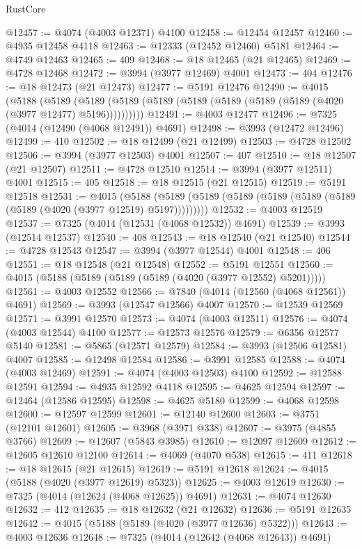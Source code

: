 \begin{lexlean}{RustCore}
\begin{coremodule}
@12457 := @4074 (@4003 @12371) @4100
@12458 := @12454 @12457
@12460 := @4935 @12458 @4118
@12463 := @12333 (@12452 @12460) @5181
@12464 := @4749 @12463
@12465 := 409
@12468 := @18 @12465 (@21 @12465)
@12469 := @4728 @12468
@12472 := @3994 (@3977 @12469) @4001
@12473 := 404
@12476 := @18 @12473 (@21 @12473)
@12477 := @5191 @12476
@12490 := @4015
    (@5188
      (@5189 (@5189 (@5189 (@5189 (@5189 (@5189 (@5189 (@5189 (@4020 (@3977 @12477) @5196))))))))))
@12491 := @4003 @12477
@12496 := @7325 (@4014 (@12490 (@4068 @12491)) @4691)
@12498 := @3993 (@12472 @12496)
@12499 := 410
@12502 := @18 @12499 (@21 @12499)
@12503 := @4728 @12502
@12506 := @3994 (@3977 @12503) @4001
@12507 := 407
@12510 := @18 @12507 (@21 @12507)
@12511 := @4728 @12510
@12514 := @3994 (@3977 @12511) @4001
@12515 := 405
@12518 := @18 @12515 (@21 @12515)
@12519 := @5191 @12518
@12531 := @4015
    (@5188 (@5189 (@5189 (@5189 (@5189 (@5189 (@5189 (@5189 (@4020 (@3977 @12519) @5197)))))))))
@12532 := @4003 @12519
@12537 := @7325 (@4014 (@12531 (@4068 @12532)) @4691)
@12539 := @3993 (@12514 @12537)
@12540 := 408
@12543 := @18 @12540 (@21 @12540)
@12544 := @4728 @12543
@12547 := @3994 (@3977 @12544) @4001
@12548 := 406
@12551 := @18 @12548 (@21 @12548)
@12552 := @5191 @12551
@12560 := @4015 (@5188 (@5189 (@5189 (@5189 (@4020 (@3977 @12552) @5201)))))
@12561 := @4003 @12552
@12566 := @7840 (@4014 (@12560 (@4068 @12561)) @4691)
@12569 := @3993 (@12547 @12566) @4007
@12570 := @12539 @12569
@12571 := @3991 @12570
@12573 := @4074 (@4003 @12511)
@12576 := @4074 (@4003 @12544) @4100
@12577 := @12573 @12576
@12579 := @6356 @12577 @5140
@12581 := @5865 (@12571 @12579)
@12584 := @3993 (@12506 @12581) @4007
@12585 := @12498 @12584
@12586 := @3991 @12585
@12588 := @4074 (@4003 @12469)
@12591 := @4074 (@4003 @12503) @4100
@12592 := @12588 @12591
@12594 := @4935 @12592 @4118
@12595 := @4625 @12594
@12597 := @12464 (@12586 @12595)
@12598 := @4625 @5180
@12599 := @4068 @12598
@12600 := @12597 @12599
@12601 := @12140 @12600
@12603 := @3751 (@12101 @12601)
@12605 := @3968 (@3971 @338)
@12607 := @3975 (@4855 @3766)
@12609 := @12607 (@5843 @3985)
@12610 := @12097 @12609
@12612 := @12605 @12610 @12100
@12614 := @4069 (@4070 @538)
@12615 := 411
@12618 := @18 @12615 (@21 @12615)
@12619 := @5191 @12618
@12624 := @4015 (@5188 (@4020 (@3977 @12619) @5323))
@12625 := @4003 @12619
@12630 := @7325 (@4014 (@12624 (@4068 @12625)) @4691)
@12631 := @4074 @12630
@12632 := 412
@12635 := @18 @12632 (@21 @12632)
@12636 := @5191 @12635
@12642 := @4015 (@5188 (@5189 (@4020 (@3977 @12636) @5322)))
@12643 := @4003 @12636
@12648 := @7325 (@4014 (@12642 (@4068 @12643)) @4691)

\end{coremodule}
\end{lexlean}
